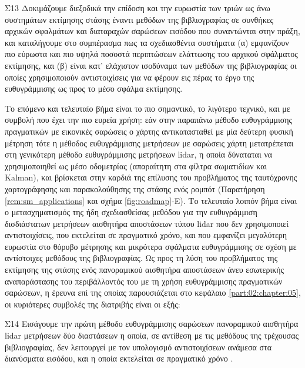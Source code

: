 \begin{bw_box}
\begin{customcontribution}{Σ13}
  \label{contribution:13}
  Δοκιμάζουμε διεξοδικά την επίδοση και την ευρωστία των τριών ως άνω
  συστημάτων εκτίμησης στάσης έναντι μεθόδων της βιβλιογραφίας σε συνθήκες
  αρχικών σφαλμάτων και διαταραχών σαρώσεων εισόδου που συναντώνται στην πράξη,
  και καταλήγουμε στο συμπέρασμα πως τα σχεδιασθέντα συστήματα (α) εμφανίζουν
  πιο εύρωστα και πιο υψηλά ποσοστά περιπτώσεων ελάττωσης του αρχικού σφάλματος
  εκτίμησης, και (β) είναι κατ' ελάχιστον ισοδύναμα των μεθόδων της
  βιβλιογραφίας οι οποίες χρησιμοποιούν αντιστοιχίσεις για να φέρουν εις πέρας
  το έργο της ευθυγράμμισης ως προς το μέσο σφάλμα εκτίμησης.
\end{customcontribution}
\end{bw_box}
\vspace{1cm}



Το επόμενο και τελευταίο βήμα είναι το πιο σημαντικό, το λιγότερο τεχνικό, και
με συμβολή που έχει την πιο ευρεία χρήση: εάν στην παραπάνω μέθοδο
ευθυγράμμισης πραγματικών με εικονικές σαρώσεις ο χάρτης αντικατασταθεί με μία
δεύτερη φυσική μέτρηση τότε η μέθοδος ευθυγράμμισης μετρήσεων με σαρώσεις χάρτη
μετατρέπεται στη γενικότερη μέθοδο ευθυγράμμισης μετρήσεων lidar, η οποία
δύναταται να χρησιμοποιηθεί ως μέσο οδομετρίας (απαραίτητη στα φίλτρα
σωματιδίων και Kalman), και βρίσκεται στην καρδιά της επίλυσης του προβλήματος
της ταυτόχρονης χαρτογράφησης και παρακολούθησης της στάσης ενός ρομπότ
(Παρατήρηση \ref{rem:sm_applications} και σχήμα \ref{fig:roadmap}-Ε). Το
τελευταίο λοιπόν βήμα είναι ο μετασχηματισμός της ήδη σχεδιασθείσας μεθόδου για
την ευθυγράμμιση δισδιάστατων μετρήσεων αισθητήρα αποστάσεων τύπου lidar που
δεν χρησιμοποιεί αντιστοιχίσεις, που εκτελείται σε πραγματικό χρόνο, και που
εμφανίζει μεγαλύτερη ευρωστία στο θόρυβο μέτρησης και μικρότερα σφάλματα
ευθυγράμμισης σε σχέση με αντίστοιχες μεθόδους της βιβλιογραφίας. Ως προς τη
λύση του προβλήματος της εκτίμησης της στάσης ενός πανοραμικού αισθητήρα
αποστάσεων άνευ εσωτερικής αναπαράστασης του περιβάλλοντός του με τη χρήση
ευθυγράμμισης πραγματικών σαρώσεων, η έρευνα επί της οποίας παρουσιάζεται στο
κεφάλαιο \ref{part:02:chapter:05}, οι κυριότερες συμβολές της διατριβής είναι
οι εξής:

\begin{bw_box}
\begin{customcontribution}{Σ14}
  \label{contribution:14}
  Εισάγουμε την πρώτη μέθοδο ευθυγράμμισης σαρώσεων πανοραμικού αισθητήρα
  lidar μετρήσεων δύο διαστάσεων η οποία, σε αντίθεση με τις μεθόδους της
  τρέχουσας βιβλιογραφίας, δεν λειτουργεί με τον υπολογισμό αντιστοιχίσεων
  ανάμεσα στα διανύσματα εισόδου, και η οποία εκτελείται σε πραγματικό χρόνο
  \cite{Filotheou2022i}.
\end{customcontribution}
\end{bw_box}

